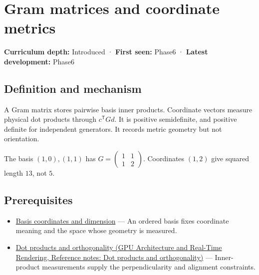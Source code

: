 \hypertarget{appendix-3b863809f82a}{}\label{referencestart:appendix-3b863809f82a}
\section{Gram matrices and coordinate metrics}\label{appendix-3b863809f82a-gram-matrices-and-coordinate-metrics}

\hypertarget{appendix-3b863809f82a-gram-matrices-and-coordinate-metrics}{}

\textbf{Curriculum depth:} Introduced · \textbf{First seen:} Phase6 · \textbf{Latest development:} Phase6

\begin{allmightroledefinition}

\subsection{Definition and mechanism}\label{appendix-3b863809f82a-definition-and-mechanism}

\hypertarget{appendix-3b863809f82a-definition-and-mechanism}{}

A Gram matrix stores pairwise basis inner products. Coordinate vectors measure physical dot products through \(c^\mathsf TGd\). It is positive semidefinite, and positive definite for independent generators. It records metric geometry but not orientation.

\end{allmightroledefinition}

The basis \((1,0),(1,1)\) has \(G=\begin{pmatrix}1&1\\1&2\end{pmatrix}\). Coordinates \((1,2)\) give squared length \(13\), not \(5\).

\subsection{Prerequisites}\label{appendix-3b863809f82a-prerequisites}

\hypertarget{appendix-3b863809f82a-prerequisites}{}

\begin{itemize}
\tightlist
\item
  \hyperref[appendix-ce0341f7ea0d]{Basis coordinates and dimension} --- An ordered basis fixes coordinate meaning and the space whose geometry is measured.
\item
  \href{../06-GPU-Architecture-and-Real-Time-Rendering/main.pdf\#nameddest=appendix-8bc4e8fc547c}{Dot products and orthogonality (GPU Architecture and Real-Time Rendering, Reference notes: Dot products and orthogonality)} --- Inner-product measurements supply the perpendicularity and alignment constraints.
\end{itemize}

